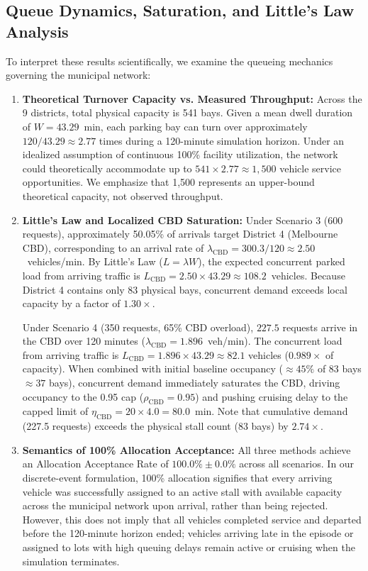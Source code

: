 \documentclass[journal]{IEEEtran}
\begin{document}
\subsection{Queue Dynamics, Saturation, and Little's Law Analysis}
To interpret these results scientifically, we examine the queueing mechanics governing the municipal network:
\begin{enumerate}
    \item \textbf{Theoretical Turnover Capacity vs. Measured Throughput:} Across the 9 districts, total physical capacity is 541 bays. Given a mean dwell duration of $W = 43.29$~min, each parking bay can turn over approximately $120 / 43.29 \approx 2.77$ times during a 120-minute simulation horizon. Under an idealized assumption of continuous 100\% facility utilization, the network could theoretically accommodate up to $541 \times 2.77 \approx 1,500$ vehicle service opportunities. We emphasize that 1,500 represents an upper-bound theoretical capacity, not observed throughput.
    \item \textbf{Little's Law and Localized CBD Saturation:} Under Scenario 3 (600 requests), approximately 50.05\% of arrivals target District 4 (Melbourne CBD), corresponding to an arrival rate of $\lambda_{\text{CBD}} = 300.3 / 120 \approx 2.50$~vehicles/min. By Little's Law ($L = \lambda W$), the expected concurrent parked load from arriving traffic is $L_{\text{CBD}} = 2.50 \times 43.29 \approx 108.2$~vehicles. Because District 4 contains only 83 physical bays, concurrent demand exceeds local capacity by a factor of $1.30\times$. 

    Under Scenario 4 (350 requests, 65\% CBD overload), $227.5$ requests arrive in the CBD over 120 minutes ($\lambda_{\text{CBD}} = 1.896$~veh/min). The concurrent load from arriving traffic is $L_{\text{CBD}} = 1.896 \times 43.29 \approx 82.1$ vehicles ($0.989\times$ of capacity). When combined with initial baseline occupancy ($\approx 45\%$ of 83 bays $\approx 37$ bays), concurrent demand immediately saturates the CBD, driving occupancy to the 0.95 cap ($\rho_{\text{CBD}} = 0.95$) and pushing cruising delay to the capped limit of $\eta_{\text{CBD}} = 20 \times 4.0 = 80.0$~min. Note that cumulative demand (227.5 requests) exceeds the physical stall count (83 bays) by $2.74\times$.
    \item \textbf{Semantics of 100\% Allocation Acceptance:} All three methods achieve an Allocation Acceptance Rate of $100.0\% \pm 0.0\%$ across all scenarios. In our discrete-event formulation, 100\% allocation signifies that every arriving vehicle was successfully assigned to an active stall with available capacity across the municipal network upon arrival, rather than being rejected. However, this does not imply that all vehicles completed service and departed before the 120-minute horizon ended; vehicles arriving late in the episode or assigned to lots with high queuing delays remain active or cruising when the simulation terminates.
\end{enumerate}
\end{document}
